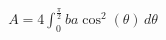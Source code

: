 \documentclass[preview]{standalone}
\begin{document}
\begin{align*}
A = 4 \int_0^{\frac{\pi}{2}} b a \cos^2(\theta) \, d\theta
\end{align*}
\end{document}
